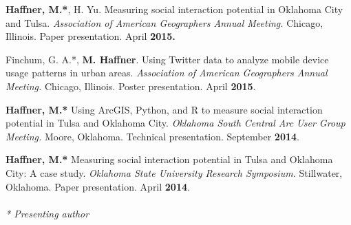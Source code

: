 \begin{cventries}
   \cventry
      {}
      {}
      {}
      {}
      {
        \begin{cvitems}
          \vspace{-2mm}
        \item {\textbf{Haffner, M.*}, H. Yu. Measuring social interaction
            potential in Oklahoma City and Tulsa. \textit{Association of
              American Geographers Annual Meeting.} Chicago, Illinois. Paper
            presentation. April \textbf{2015.}}
              \end{cvitems}
              }

   \cventry
      {}
      {}
      {}
      {}
      {
        \begin{cvitems}
          \vspace{-2mm}
        \item {Finchum, G. A.*, \textbf{M. Haffner}. Using Twitter data to
            analyze mobile device usage patterns in urban areas.
            \textit{Association of American Geographers Annual Meeting.}
            Chicago, Illinois. Poster presentation. April \textbf{2015}.}
              \end{cvitems}
            }

   \cventry
      {}
      {}
      {}
      {}
      {
        \begin{cvitems}
          \vspace{-2mm}
        \item {\textbf{Haffner, M.*} Using ArcGIS, Python, and R to measure
            social interaction potential in Tulsa and Oklahoma City.
            \textit{Oklahoma South Central Arc User Group Meeting.} Moore,
            Oklahoma. Technical presentation. September \textbf{2014}.}
            \end{cvitems}
            }

   \cventry
      {}
      {}
      {}
      {}
      {
        \begin{cvitems}
          \vspace{-2mm}
        \item {\textbf{Haffner, M.*} Measuring social interaction potential in
            Tulsa and Oklahoma City: A case study. \textit{Oklahoma State
              University Research Symposium.} Stillwater,
            Oklahoma. Paper presentation. April \textbf{2014}.} \\\\
          \textit{* Presenting author}
              \end{cvitems}
            }

\end{cventries}